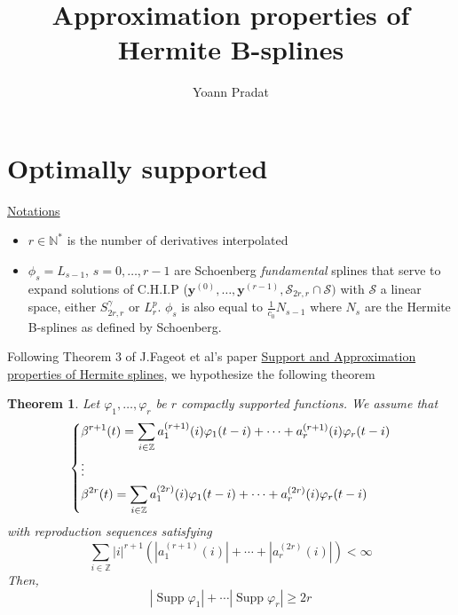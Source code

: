 \documentclass[a4paper, 11pt]{article}
\newtheorem{thm}{Theorem}
\DeclareMathOperator*{\Supp}{Supp}
\begin{document}
\title{Approximation properties of Hermite B-splines}
\author{Yoann Pradat}
\maketitle
\tableofcontents

\section{Optimally supported}

\underline{Notations}
\begin{itemize}
  \item $r \in \mathbb{N}^*$ is the number of derivatives interpolated
  \item $\phi_s = L_{s-1}$, $s=0, \ldots, r-1$ are Schoenberg \emph{fundamental} splines that serve to expand solutions 
    of C.H.I.P ($\bm{y}^{(0)}, \ldots, \bm{y}^{(r-1)}, \mathcal{S}_{2r,r} \cap \mathcal{S})$ with $\mathcal{S}$ a linear 
    space, either $S_{2r,r}^{\gamma}$ or $L^p_r$.  $\phi_s$ is also equal to $\frac{1}{c_0} N_{s-1}$ where $N_s$ are the 
    Hermite B-splines as defined by Schoenberg.
\end{itemize}

Following Theorem 3 of J.Fageot et al's paper \underline{Support and Approximation properties of Hermite splines}, we 
hypothesize the following theorem

\begin{thm}
  Let $\varphi_1, \ldots, \varphi_r$ be $r$ compactly supported functions. We assume that
  \begin{equation}\label{eq:system-time}
    \begin{dcases}
      \beta^{r+1}(t) = \sum_{i \in \mathbb{Z}} a_1^{(r+1)}(i) \varphi_1(t-i) + \cdots  + a_r^{(r+1)}(i) \varphi_r(t-i) 
      \\
      \vdots \\
      \beta^{2r}(t) = \sum_{i \in \mathbb{Z}} a_1^{(2r)}(i) \varphi_1(t-i) + \cdots  + a_r^{(2r)}(i) \varphi_r(t-i) \\
    \end{dcases}
  \end{equation}
  with reproduction sequences satisfying 
  \begin{equation}\label{eq:condition}
    \sum_{i \in \mathbb{Z}} |i|^{r+1}(|a_1^{(r+1)}(i)| + \cdots + |a_r^{(2r)}(i)|) < \infty
  \end{equation}
  Then, 
  \begin{equation}
    |\Supp\varphi_1| + \cdots |\Supp\varphi_r| \geq 2r
  \end{equation}
\end{thm}
\end{document}
